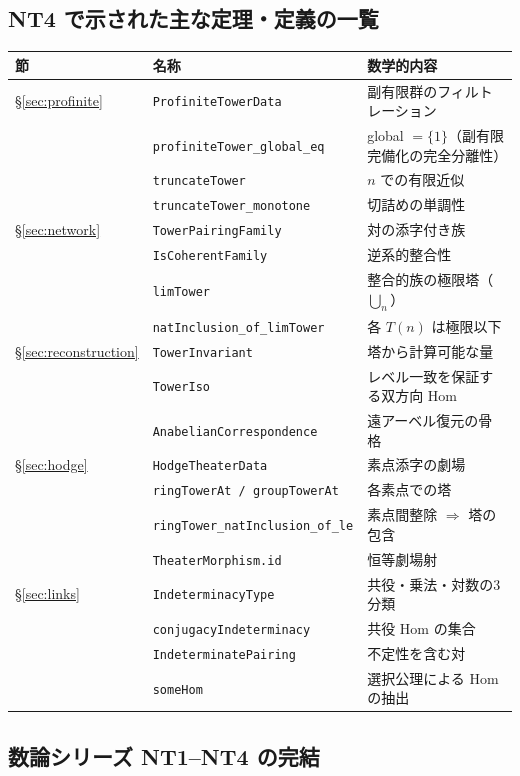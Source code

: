 \documentclass[a4paper,11pt]{ltjsarticle}
\theoremstyle{definition}
\theoremstyle{plain}
\theoremstyle{remark}
\begin{document}
\subsection{NT4 で示された主な定理・定義の一覧}

\begin{center}
\begin{tabular}{lll}
\toprule
節 & 名称 & 数学的内容 \\
\midrule
\S\ref{sec:profinite} & \texttt{ProfiniteTowerData} & 副有限群のフィルトレーション \\
& \texttt{profiniteTower\_global\_eq} & global $= \{1\}$（副有限完備化の完全分離性） \\
& \texttt{truncateTower} & $n$ での有限近似 \\
& \texttt{truncateTower\_monotone} & 切詰めの単調性 \\
\midrule
\S\ref{sec:network} & \texttt{TowerPairingFamily} & 対の添字付き族 \\
& \texttt{IsCoherentFamily} & 逆系的整合性 \\
& \texttt{limTower} & 整合的族の極限塔（$\bigcup_n$）\\
& \texttt{natInclusion\_of\_limTower} & 各 $T(n)$ は極限以下 \\
\midrule
\S\ref{sec:reconstruction} & \texttt{TowerInvariant} & 塔から計算可能な量 \\
& \texttt{TowerIso} & レベル一致を保証する双方向 Hom \\
& \texttt{AnabelianCorrespondence} & 遠アーベル復元の骨格 \\
\midrule
\S\ref{sec:hodge} & \texttt{HodgeTheaterData} & 素点添字の劇場 \\
& \texttt{ringTowerAt / groupTowerAt} & 各素点での塔 \\
& \texttt{ringTower\_natInclusion\_of\_le} & 素点間整除 $\Rightarrow$ 塔の包含 \\
& \texttt{TheaterMorphism.id} & 恒等劇場射 \\
\midrule
\S\ref{sec:links} & \texttt{IndeterminacyType} & 共役・乗法・対数の3分類 \\
& \texttt{conjugacyIndeterminacy} & 共役 Hom の集合 \\
& \texttt{IndeterminatePairing} & 不定性を含む対 \\
& \texttt{someHom} & 選択公理による Hom の抽出 \\
\bottomrule
\end{tabular}
\end{center}

\subsection{数論シリーズ NT1--NT4 の完結}
\end{document}
